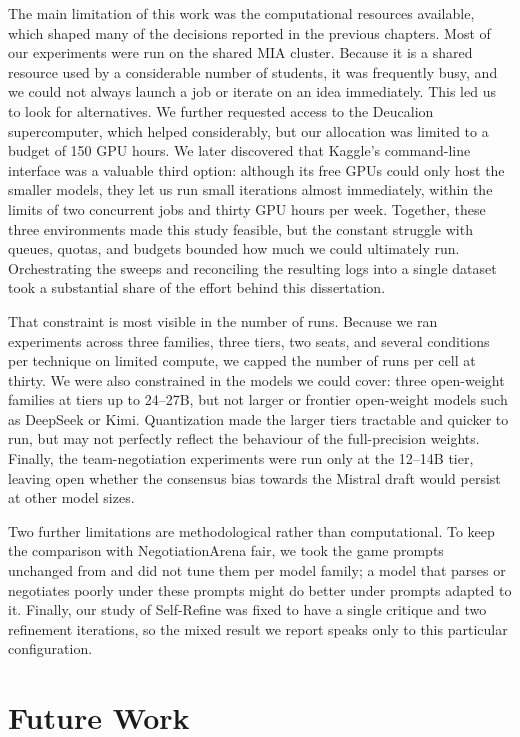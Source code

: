 The main limitation of this work was the computational resources available, which shaped many of the decisions reported in the previous chapters. Most of our experiments were run on the shared MIA cluster. Because it is a shared resource used by a considerable number of students, it was frequently busy, and we could not always launch a job or iterate on an idea immediately. This led us to look for alternatives. We further requested access to the Deucalion supercomputer, which helped considerably, but our allocation was limited to a budget of 150 GPU hours. We later discovered that Kaggle's command-line interface was a valuable third option: although its free GPUs could only host the smaller models, they let us run small iterations almost immediately, within the limits of two concurrent jobs and thirty GPU hours per week. Together, these three environments made this study feasible, but the constant struggle with queues, quotas, and budgets bounded how much we could ultimately run. Orchestrating the sweeps and reconciling the resulting logs into a single dataset took a substantial share of the effort behind this dissertation.

That constraint is most visible in the number of runs. Because we ran experiments across three families, three tiers, two seats, and several conditions per technique on limited compute, we capped the number of runs per cell at thirty. We were also constrained in the models we could cover: three open-weight families at tiers up to 24--27B, but not larger or frontier open-weight models such as DeepSeek or Kimi. Quantization made the larger tiers tractable and quicker to run, but may not perfectly reflect the behaviour of the full-precision weights. Finally, the team-negotiation experiments were run only at the 12--14B tier, leaving open whether the consensus bias towards the Mistral draft would persist at other model sizes.

Two further limitations are methodological rather than computational. To keep the comparison with NegotiationArena fair, we took the game prompts unchanged from \textcite{bianchi_how_2024} and did not tune them per model family; a model that parses or negotiates poorly under these prompts might do better under prompts adapted to it. Finally, our study of Self-Refine was fixed to have a single critique and two refinement iterations, so the mixed result we report speaks only to this particular configuration.

\section{Future Work}\label{sec:conclusion-future-work}

